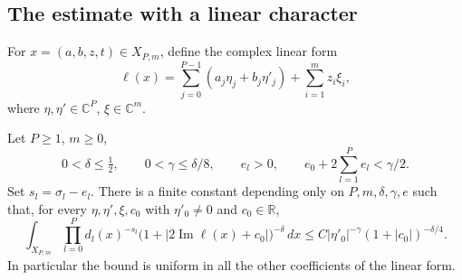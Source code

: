 \subsection{The estimate with a linear character}

For \(x=(a,b,z,t)\in X_{P,m}\), define the complex linear form
\[
 \ell(x)=\sum_{j=0}^{P-1}(a_j\eta_j+b_j\eta'_j)
                                      +\sum_{i=1}^{m}z_i\xi_i,
\]
where \(\eta,\eta'\in\mathbb C^P\), \(\xi\in\mathbb C^m\).

\begin{theorem}\label{jk-oscillatory}
Let \(P\geq1\), \(m\geq0\),
\[
 0<\delta\leq\tfrac12,\qquad
 0<\gamma\leq\delta/8,\qquad e_l>0,
 \qquad e_0+2\sum_{l=1}^{P}e_l<\gamma/2 .
\]
Set \(s_l=\sigma_l-e_l\).
There is a finite constant depending only on
\(P,m,\delta,\gamma,e\) such that, for every
\(\eta,\eta',\xi,c_0\) with \(\eta'_0\ne0\) and \(c_0\in\mathbb R\),
\begin{equation}\label{jk-os}
 \int_{X_{P,m}}\prod_{l=0}^{P}d_l(x)^{-s_l}
          \bigl(1+|2\operatorname{Im}\ell(x)+c_0|\bigr)^{-\delta}
             \,dx
 \leq C|\eta'_0|^{-\gamma}(1+|c_0|)^{-\delta/4}.
\end{equation}
In particular the bound is uniform in all the other coefficients
of the linear form.
\end{theorem}

